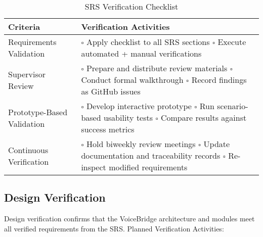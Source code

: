 \documentclass[12pt, titlepage]{article}
\begin{document}
\begin{table}[H]
\centering
\caption{SRS Verification Checklist}
\renewcommand{\arraystretch}{1.3}
\begin{tabular}{|p{5cm}|p{9cm}|}
\hline
\textbf{Criteria} & \textbf{Verification Activities} \\ \hline

Requirements Validation &
\(\square\) Apply checklist to all SRS sections \newline
\(\square\) Execute automated + manual verifications \\ \hline

Supervisor Review &
\(\square\) Prepare and distribute review materials \newline
\(\square\) Conduct formal walkthrough \newline
\(\square\) Record findings as GitHub issues \\ \hline

Prototype-Based Validation &
\(\square\) Develop interactive prototype \newline
\(\square\) Run scenario-based usability tests \newline
\(\square\) Compare results against success metrics \\ \hline

Continuous Verification &
\(\square\) Hold biweekly review meetings \newline
\(\square\) Update documentation and traceability records \newline
\(\square\) Re-inspect modified requirements \\ \hline

\end{tabular}
\end{table}


\subsection{Design Verification}

Design verification confirms that the VoiceBridge architecture and modules meet all verified requirements from the SRS. Planned Verification Activities:
\end{document}
